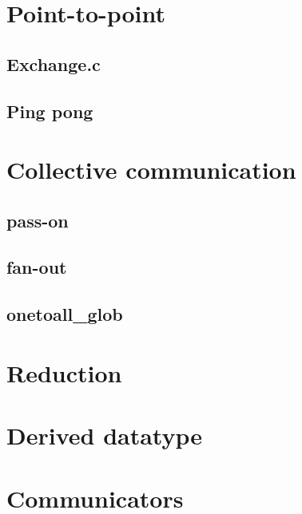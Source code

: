 \chapter{Point-to-point}

\section{Exchange.c}


\section{Ping pong}


\chapter{Collective communication}

\section{pass-on}


\section{fan-out}


\section{onetoall\_glob}


\chapter{Reduction}



\chapter{Derived datatype}



\chapter{Communicators}


